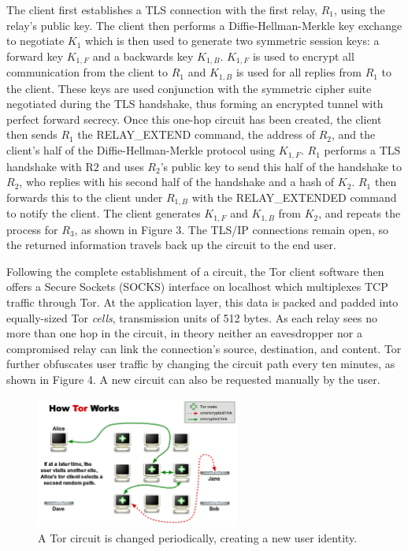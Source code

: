 The client first establishes a TLS connection with the first relay, $R_{1}$, using the relay's public key. The client then performs a Diffie-Hellman-Merkle key exchange to negotiate $K_{1}$ which is then used to generate two symmetric session keys: a forward key $K_{1,F}$ and a backwards key $K_{1,B}$. $K_{1,F}$ is used to encrypt all communication from the client to $R_{1}$ and $K_{1,B}$ is used for all replies from $R_{1}$ to the client. These keys are used conjunction with the symmetric cipher suite negotiated during the TLS handshake, thus forming an encrypted tunnel with perfect forward secrecy. Once this one-hop circuit has been created, the client then sends $R_{1}$ the RELAY\_EXTEND command, the address of $R_{2}$, and the client's half of the Diffie-Hellman-Merkle protocol using $K_{1,F}$. $R_{1}$ performs a TLS handshake with R${2}$ and uses $R_{2}$'s public key to send this half of the handshake to $R_{2}$, who replies with his second half of the handshake and a hash of $K_{2}$. $R_{1}$ then forwards this to the client under $R_{1,B}$ with the RELAY\_EXTENDED command to notify the client. The client generates $K_{1,F}$ and $K_{1,B}$ from $K_{2}$, and repeats the process for $R_{3}$,\cite{Ling2012} as shown in Figure 3. The TLS/IP connections remain open, so the returned information travels back up the circuit to the end user.

Following the complete establishment of a circuit, the Tor client software then offers a Secure Sockets (SOCKS) interface on localhost which multiplexes TCP traffic through Tor. At the application layer, this data is packed and padded into equally-sized Tor \textit{cells}, transmission units of 512 bytes. As each relay sees no more than one hop in the circuit, in theory neither an eavesdropper nor a compromised relay can link the connection's source, destination, and content. Tor further obfuscates user traffic by changing the circuit path every ten minutes,\cite{McCoy2008} as shown in Figure 4. A new circuit can also be requested manually by the user.

\begin{figure}[htbp]
	\centering
	\includegraphics[width=0.6\textwidth]{images/circuit-change-1-4.png}
	\caption{A Tor circuit is changed periodically, creating a new user identity.}
	\label{fig:figure3}
\end{figure}

